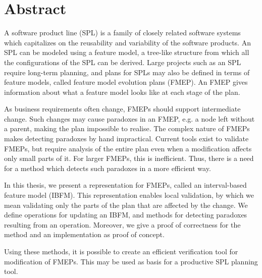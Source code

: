 \chapter*{Abstract}
A software product line (SPL) is a family of closely related software systems which capitalizes on the reusability and variability of the software products. 
An SPL can be modeled using a feature model, a tree-like structure from which all the configurations of the SPL can be derived.
Large projects such as an SPL require long-term planning, and plans for SPLs may also be defined in terms of feature models, called feature model evolution plans (FMEP). An FMEP gives information about what a feature model looks like at each stage of the plan.

As business requirements often change, FMEPs should support intermediate change. Such changes may cause paradoxes in an FMEP,  e.g. a node left without a parent, making the plan impossible to realise. The complex nature of FMEPs makes detecting paradoxes by hand impractical. Current tools exist to validate FMEPs, but require analysis of the entire plan even when a modification affects only small parts of it. For larger FMEPs, this is inefficient. Thus, there is a need for a method which detects such paradoxes in a more efficient way.

In this thesis, we present a representation for FMEPs, called an interval-based feature model (IBFM). This representation enables local validation, by which we mean validating only the parts of the plan that are affected by the change. We define operations for updating an IBFM, and methods for detecting paradoxes resulting from an operation. Moreover, we give a proof of correctness for the method and an implementation as proof of concept.
 
Using these methods, it is possible to create an efficient verification tool for modification of FMEPs. This may be used as basis for a productive SPL planning tool. 


